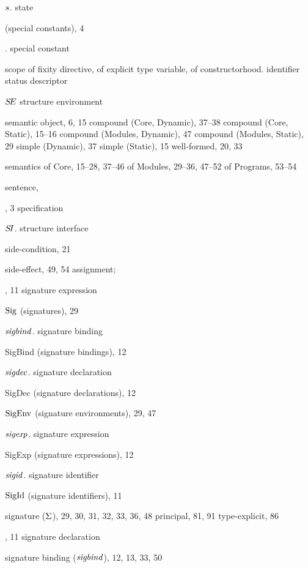 \begin{theindex}
\indexspace
\item $s$. \see state
\item {\SCon} (special constants), 4
\item {\scon}. \see special constant 
\item scope 
\subitem of fixity directive, \scopefixityrefs
\subitem of explicit type variable, \scopeexpltyvarsrefs
\subitem of constructorhood. \see identifier status descriptor
\item $\mbox{$S\!E$}$ \see structure environment 
\item semantic object, 6, 15
\subitem compound (Core, Dynamic), 37--38
\subitem compound (Core, Static), 15--16
\subitem compound (Modules, Dynamic), 47
\subitem compound (Modules, Static), 29
\subitem simple (Dynamic), 37
\subitem simple (Static), 15
\subitem well-formed, 20, 33
\item semantics
\subitem of Core, 15--28, 37--46
\subitem of Modules, 29--36, 47--52
\subitem of Programs, 53--54
\item sentence, \tsrefs
\item \SHARING, 3
\subitem \seealso specification
\item $\mbox{$S\!I$}$. \see structure interface
\item side-condition, 21
\item side-effect, 49, 54
\subitem \seealso assignment; 
\item \SIG, 11
\subitem \seealso signature expression
\item ${\rm Sig}$ (signatures), 29
\item ${\it sigbind}$. \see signature binding
\item SigBind (signature bindings), 12
\item ${\it sigdec}$. \see signature declaration
\item SigDec (signature declarations), 12
\item ${\rm SigEnv}$ (signature environments), 29, 47
\item ${\it sigexp}$. \see signature expression
\item SigExp (signature expressions), 12
\item ${\it sigid}$. \see signature identifier
\item ${\rm SigId}$ (signature identifiers), 11
\item signature ($\Sigma$), 29, 30, 31, 32, 33, 36, 48
\subitem principal, 81, 91
\subitem type-explicit, 86
\item \SIGNATURE, 11
\subitem \seealso signature declaration
\item signature binding (${\it sigbind}$), 12, 13, 33, 50

\end{theindex}
